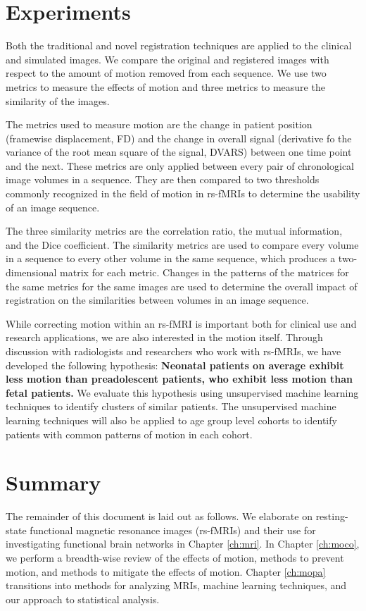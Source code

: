 \section{Experiments}

Both the traditional and novel registration techniques are applied to the clinical and simulated images. We compare the original and registered images with respect to the amount of motion removed from each sequence. We use two metrics to measure the effects of motion and three metrics to measure the similarity of the images. 

The metrics used to measure motion are the change in patient position (framewise displacement, FD) and the change in overall signal (derivative fo the variance of the root mean square of the signal, DVARS) between one time point and the next. These metrics are only applied between every pair of chronological image volumes in a sequence. They are then compared to two thresholds commonly recognized in the field of motion in rs-fMRIs to determine the usability of an image sequence.

The three similarity metrics are the correlation ratio, the mutual information, and the Dice coefficient. The similarity metrics are used to compare every volume in a sequence to every other volume in the same sequence, which produces a two-dimensional matrix for each metric. Changes in the patterns of the matrices for the same metrics for the same images are used to determine the overall impact of registration on the similarities between volumes in an image sequence.

While correcting motion within an rs-fMRI is important both for clinical use and research applications, we are also interested in the motion itself. Through discussion with radiologists and researchers who work with rs-fMRIs, we have developed the following hypothesis: \textbf{Neonatal patients on average exhibit less motion than preadolescent patients, who exhibit less motion than fetal patients.} We evaluate this hypothesis using unsupervised machine learning techniques to identify clusters of similar patients. The unsupervised machine learning techniques will also be applied to age group level cohorts to identify patients with common patterns of motion in each cohort.

\section{Summary}


The remainder of this document is laid out as follows. We elaborate on resting-state functional magnetic resonance images (rs-fMRIs) and their use for investigating functional brain networks in Chapter \ref{ch:mri}. In Chapter \ref{ch:moco}, we perform a breadth-wise review of the effects of motion, methods to prevent motion, and methods to mitigate the effects of motion.
Chapter \ref{ch:mopa} transitions into methods for analyzing MRIs, machine learning techniques, and our approach to statistical analysis. 

